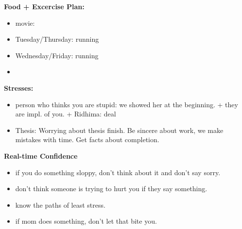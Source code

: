 \documentclass[11pt]{article}
\begin{document}
{            \textbf{Food + Excercise Plan:}\\
            \begin{itemize} 
              \item \tiny movie: 
              \tiny \item \tiny Tuesday/Thursday: running 
            \item \tiny Wednesday/Friday: running 
            \item \tiny 
            \end{itemize}
            \textbf{Stresses:}\\
            \begin{itemize} 
            \item \tiny person who thinks you are stupid:  we
              showed her at the beginning.  + they are impl. of you. +
               Ridhima: deal 
            \item \tiny Thesis:  Worrying about thesis finish. Be
              sincere about work, we make mistakes with time. Get
              facts about completion.
            \end{itemize}
            
            \textbf{Real-time Confidence}\\
            \begin{itemize}
              \tiny \item \tiny if you do something sloppy, don't
              think about it and don't say sorry.
            \item \tiny don't think someone is trying to hurt you if
              they say something.
            \item \tiny know the paths of least stress.
            \item \tiny if mom does something, don't let that bite
              you. 
            \end{itemize}

}
\end{document}
